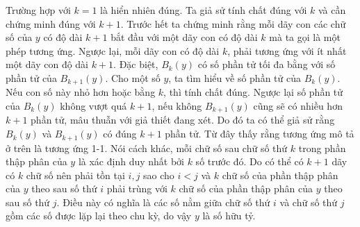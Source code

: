 \begin{ex}
{Trường hợp với $k=1$ là hiển nhiên đúng. Ta giả sử tính chất đúng với $k$ và cần chứng minh đúng với $k+1$. Trước hết ta chứng minh rằng mỗi dãy con các chữ số của $y$ có độ dài $k+1$ bắt đầu với một dãy con có độ dài $k$ mà ta gọi là một phép tương ứng. Ngược lại, mỗi dãy con có độ dài $k$, phải tương ứng với ít nhất một dãy con độ dài $k+1$. Đặc biệt, $B_k(y)$ có số phần tử tối đa bằng với số phần tử của $B_{k+1}(y)$. Cho một số $y$, ta tìm hiểu về số phần tử của $B_k(y)$. Nếu con số này nhỏ hơn hoặc bằng $k$, thì tính chất đúng. Ngược lại số phần tử của $B_k(y)$ không vượt quá $k+1$, nếu không $B_{k+1}(y)$ cũng sẽ có nhiều hơn $k+1$ phần tử, mâu thuẫn với giả thiết đang xét. Do đó ta có thể giả sử rằng $B_k(y)$ và $B_{k+1}(y)$ có đúng $k+1$ phần tử. Từ đây thấy rằng tương ứng mô tả ở trên là tương ứng 1-1. Nói cách khác, mỗi chữ số sau chữ số thứ $k$ trong phần thập phân của $y$ là xác định duy nhất bởi $k$ số trước đó. Do có thể có $k+1$ dãy có $k$ chữ số nên phải tồn tại $i, j$ sao cho $i<j$ và $k$ chữ số của phần thập phân của $y$ theo sau số thứ $i$ phải trùng với $k$ chữ số của phần thập phân của $y$ theo sau số thứ $j$. Điều này có nghĩa là các số nằm giữa chữ số thứ $i$ và chữ số thứ $j$ gồm các số được lặp lại theo chu kỳ, do vậy $y$ là số hữu tỷ.
}
\end{ex}
